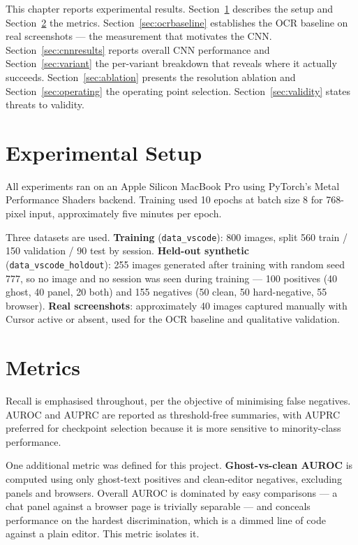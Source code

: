 \documentclass[12pt,oneside]{report}
\newcommand{\code}[1]{\texttt{\small #1}}
\begin{document}
This chapter reports experimental results. Section~\ref{sec:setup} describes
the setup and Section~\ref{sec:metrics} the metrics.
Section~\ref{sec:ocrbaseline} establishes the OCR baseline on real screenshots
--- the measurement that motivates the CNN. Section~\ref{sec:cnnresults}
reports overall CNN performance and Section~\ref{sec:variant} the per-variant
breakdown that reveals where it actually succeeds.
Section~\ref{sec:ablation} presents the resolution ablation and
Section~\ref{sec:operating} the operating point selection.
Section~\ref{sec:validity} states threats to validity.

\section{Experimental Setup}
\label{sec:setup}

All experiments ran on an Apple Silicon MacBook Pro using PyTorch's Metal
Performance Shaders backend. Training used 10 epochs at batch size 8 for
768-pixel input, approximately five minutes per epoch.

Three datasets are used. \textbf{Training} (\code{data\_vscode}): 800 images,
split 560 train / 150 validation / 90 test by session.
\textbf{Held-out synthetic} (\code{data\_vscode\_holdout}): 255 images generated
after training with random seed 777, so no image and no session was seen during
training --- 100 positives (40 ghost, 40 panel, 20 both) and 155 negatives
(50 clean, 50 hard-negative, 55 browser). \textbf{Real screenshots}:
approximately 40 images captured manually with Cursor active or absent, used
for the OCR baseline and qualitative validation.

\section{Metrics}
\label{sec:metrics}

Recall is emphasised throughout, per the objective of minimising false
negatives. AUROC and AUPRC are reported as threshold-free summaries, with AUPRC
preferred for checkpoint selection because it is more sensitive to
minority-class performance.

One additional metric was defined for this project. \textbf{Ghost-vs-clean
AUROC} is computed using only ghost-text positives and clean-editor negatives,
excluding panels and browsers. Overall AUROC is dominated by easy comparisons
--- a chat panel against a browser page is trivially separable --- and conceals
performance on the hardest discrimination, which is a dimmed line of code
against a plain editor. This metric isolates it.
\end{document}
